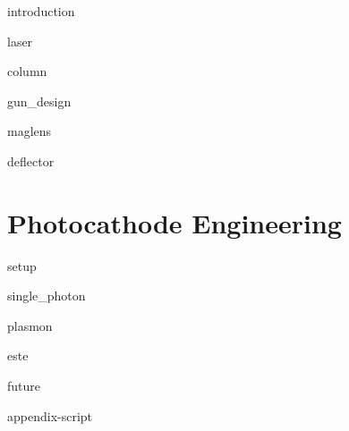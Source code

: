 \documentclass{uicthesi}
\begin{document}
  {introduction}

  {laser}

  {column}

  {gun_design}

  {maglens}

  {deflector}

\chapter{Photocathode Engineering} \label{chap:photocathode}

  {setup}

  {single_photon}

  {plasmon}

  {este}

  {future}

\appendix
  {appendix-script}

\newpage


\end{document}
